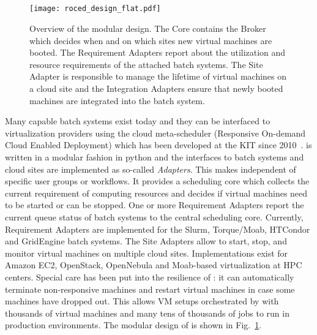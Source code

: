 \subsection{\Roced}
\begin{figure}
\begin{center}
  \texttt{[image: roced\_design\_flat.pdf]}
  \caption{Overview of the \Roced modular design. The  \Roced Core contains the Broker which decides when and on which sites new virtual machines are booted. The Requirement Adapters report about the utilization and resource requirements of the attached batch systems. The Site Adapter is responsible to manage the lifetime of virtual machines on a cloud site and the Integration Adapters ensure that newly booted machines are integrated into the batch system.}
  \label{fig-roced}
\end{center}
\end{figure}


Many capable batch systems exist today and they can be interfaced to virtualization providers using the cloud meta-scheduler \Roced (Responsive On-demand Cloud Enabled Deployment) which has been developed at the KIT since 2010~\cite{ROCED}. \Roced is written in a modular
fashion in python and the interfaces to batch systems and cloud sites
are implemented as so-called \textit{Adapters}. This makes \Roced
independent of specific user groups or workflows. It provides a
scheduling core which collects the current requirement of computing
resources and decides if virtual machines need to be started or can be
stopped. One or more Requirement Adapters report the current queue
status of batch systems to the central scheduling core. Currently,
Requirement Adapters are implemented for the Slurm, Torque/Moab, HTCondor
and GridEngine batch systems. The Site Adapters allow \Roced to start,
stop, and monitor virtual machines on multiple cloud
sites. Implementations exist for Amazon EC2, OpenStack, OpenNebula and
Moab-based virtualization at HPC centers. Special care has been put
into the resilience of \Roced: it can automatically terminate
non-responsive machines and restart virtual machines in case some
machines have dropped out. This allows VM setups orchestrated by \Roced with thousands of virtual machines and many tens of thousands of jobs to run in production environments.
The modular design of \Roced is shown in Fig.~\ref{fig-roced}.

